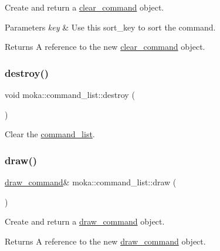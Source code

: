 Create and return a \mbox{\hyperlink{classmoka_1_1clear__command}{clear\+\_\+command}} object. 


\begin{DoxyParams}{Parameters}
{\em key} & Use this sort\+\_\+key to sort the command. \\
\hline
\end{DoxyParams}
\begin{DoxyReturn}{Returns}
A reference to the new \mbox{\hyperlink{classmoka_1_1clear__command}{clear\+\_\+command}} object. 
\end{DoxyReturn}
\mbox{\label{classmoka_1_1command__list_a297ff73bb17ff2a47e842176cf6e9be2}} 
\subsubsection{\texorpdfstring{destroy()}{destroy()}}
{\footnotesize\ttfamily void moka\+::command\+\_\+list\+::destroy (\begin{DoxyParamCaption}{ }\end{DoxyParamCaption})}



Clear the \mbox{\hyperlink{classmoka_1_1command__list}{command\+\_\+list}}. 

\mbox{\label{classmoka_1_1command__list_ad48418fa5d4388898b29fcfd2610ebaf}} 
\subsubsection{\texorpdfstring{draw()}{draw()}\hspace{0.1cm}{\footnotesize\ttfamily [1/2]}}
{\footnotesize\ttfamily \mbox{\hyperlink{classmoka_1_1draw__command}{draw\+\_\+command}}\& moka\+::command\+\_\+list\+::draw (\begin{DoxyParamCaption}{ }\end{DoxyParamCaption})}



Create and return a \mbox{\hyperlink{classmoka_1_1draw__command}{draw\+\_\+command}} object. 

\begin{DoxyReturn}{Returns}
A reference to the new \mbox{\hyperlink{classmoka_1_1draw__command}{draw\+\_\+command}} object. 
\end{DoxyReturn}
\mbox{\label{classmoka_1_1command__list_a245f4b8db48ec2f5e511778e61e1b4bf}} 
